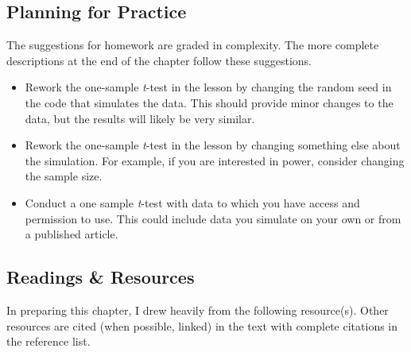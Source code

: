 \documentclass[
  11pt,
]{book}
\providecommand{\tightlist}{%
  \setlength{\itemsep}{0pt}\setlength{\parskip}{0pt}}
\begin{document}
\hypertarget{planning-for-practice-1}{%
\subsection{Planning for Practice}\label{planning-for-practice-1}}

The suggestions for homework are graded in complexity. The more complete descriptions at the end of the chapter follow these suggestions.

\begin{itemize}
\tightlist
\item
  Rework the one-sample \emph{t}-test in the lesson by changing the random seed in the code that simulates the data. This should provide minor changes to the data, but the results will likely be very similar.
\item
  Rework the one-sample \emph{t}-test in the lesson by changing something else about the simulation. For example, if you are interested in power, consider changing the sample size.
\item
  Conduct a one sample \emph{t}-test with data to which you have access and permission to use. This could include data you simulate on your own or from a published article.
\end{itemize}

\hypertarget{readings-resources-1}{%
\subsection{Readings \& Resources}\label{readings-resources-1}}

In preparing this chapter, I drew heavily from the following resource(s). Other resources are cited (when possible, linked) in the text with complete citations in the reference list.
\end{document}
